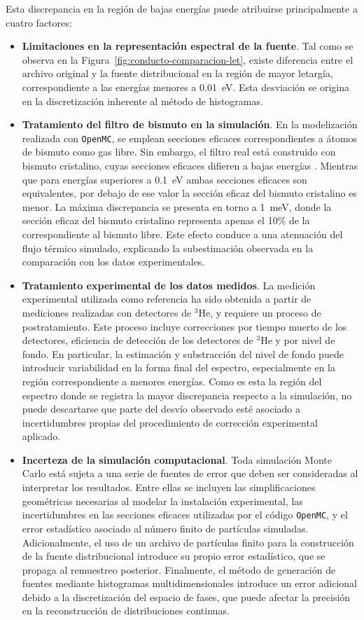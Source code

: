Esta discrepancia en la región de bajas energías puede atribuirse principalmente a cuatro factores:

\begin{itemize}
\item \textbf{Limitaciones en la representación espectral de la fuente}. Tal como se observa en la Figura~\ref{fig:conducto-comparacion-let}, existe diferencia entre el archivo original y la fuente distribucional en la región de mayor letargía, correspondiente a las energías menores a 0.01~eV. Esta desviación se origina en la discretización inherente al método de histogramas.
\item \textbf{Tratamiento del filtro de bismuto en la simulación}. En la modelización realizada con \texttt{OpenMC}, se emplean secciones eficaces correspondientes a átomos de bismuto como gas libre. Sin embargo, el filtro real está construido con bismuto cristalino, cuyas secciones eficaces difieren a bajas energías \cite{Mishra2006PULSTAR}. Mientras que para energías superiores a 0.1~eV ambas secciones eficaces son equivalentes, por debajo de ese valor la sección eficaz del bismuto cristalino es menor. La máxima discrepancia se presenta en torno a 1~meV, donde la sección eficaz del bismuto cristalino representa apenas el 10\% de la correspondiente al bismuto libre. Este efecto conduce a una atenuación del flujo térmico simulado, explicando la subestimación observada en la comparación con los datos experimentales.
\item \textbf{Tratamiento experimental de los datos medidos}. La medición experimental utilizada como referencia ha sido obtenida a partir de mediciones realizadas con detectores de ${}^3$He, y requiere un proceso de postratamiento. Este proceso incluye correcciones por tiempo muerto de los detectores, eficiencia de detección de los detectores de ${}^3$He y por nivel de fondo. En particular, la estimación y substracción del nivel de fondo puede introducir variabilidad en la forma final del espectro, especialmente en la región correspondiente a menores energías. Como es esta la región del espectro donde se registra la mayor discrepancia respecto a la simulación, no puede descartarse que parte del desvío observado esté asociado a incertidumbres propias del procedimiento de corrección experimental aplicado.
\item \textbf{Incerteza de la simulación computacional}. Toda simulación Monte Carlo está sujeta a una serie de fuentes de error que deben ser consideradas al interpretar los resultados. Entre ellas se incluyen las simplificaciones geométricas necesarias al modelar la instalación experimental, las incertidumbres en las secciones eficaces utilizadas por el código \texttt{OpenMC}, y el error estadístico asociado al número finito de partículas simuladas. Adicionalmente, el uso de un archivo de partículas finito para la construcción de la fuente distribucional introduce su propio error estadístico, que se propaga al remuestreo posterior. Finalmente, el método de generación de fuentes mediante histogramas multidimensionales introduce un error adicional debido a la discretización del espacio de fases, que puede afectar la precisión en la reconstrucción de distribuciones continuas.


\end{itemize}
